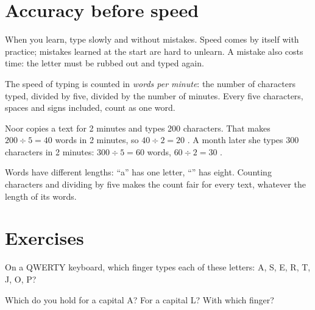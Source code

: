 \section{Accuracy before speed}

When you learn, type slowly and without mistakes. Speed comes by itself with
practice; mistakes learned at the start are hard to unlearn. A mistake also
costs time: the letter must be rubbed out and typed again.

\begin{definition}\label{def:g3:typing-with-ten-fingers:wpm}
The speed of typing is counted in \emph{words per minute}: the number of characters typed, divided by five, divided by the
number of minutes. Every five characters, spaces and signs included, count as
one word.
\end{definition}

\begin{example}\label{ex:g3:typing-with-ten-fingers:test}
Noor copies a text for 2 minutes and types 200 characters. That makes
$200 \div 5 = 40$ words in 2 minutes, so $40 \div 2 = 20$ . A
month later she types 300 characters in 2 minutes: $300 \div 5 = 60$ words,
$60 \div 2 = 30$ .
\end{example}

\begin{remark}\label{rem:g3:typing-with-ten-fingers:five}
Words have different lengths: ``a'' has one letter, ``'' has eight.
Counting characters and dividing by five makes the count fair for every text,
whatever the length of its words.
\end{remark}

\section{Exercises}

\begin{exercise}[$\star$]\label{exo:g3:typing-with-ten-fingers:1}
On a QWERTY keyboard, which finger types each of these letters: A, S, E, R,
T, J, O, P?
\end{exercise}

\begin{exercise}[$\star$]\label{exo:g3:typing-with-ten-fingers:2}
Which  do you hold for a capital A? For a capital L? With which
finger?
\end{exercise}


